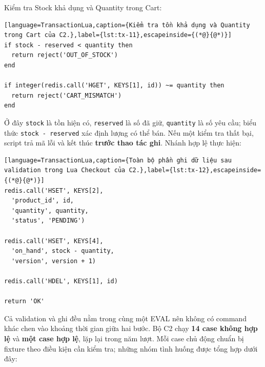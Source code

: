 Kiểm tra Stock khả dụng và Quantity trong Cart:

\begin{lstlisting}[language=TransactionLua,caption={Kiểm tra tồn khả dụng và Quantity trong Cart của C2.},label={lst:tx-11},escapeinside={(*@}{@*)}]
if stock - reserved < quantity then
  return reject('OUT_OF_STOCK')
end

if integer(redis.call('HGET', KEYS[1], id)) ~= quantity then
  return reject('CART_MISMATCH')
end
\end{lstlisting}

Ở đây \texttt{stock} là tồn hiện có, \texttt{reserved} là số đã giữ, \texttt{quantity} là số yêu cầu; biểu thức \texttt{stock -\allowbreak{} reserved} xác định lượng có thể bán. Nếu một kiểm tra thất bại, script trả mã lỗi và kết thúc \textbf{trước thao tác ghi}. Nhánh hợp lệ thực hiện:

\begin{lstlisting}[language=TransactionLua,caption={Toàn bộ phần ghi dữ liệu sau validation trong Lua Checkout của C2.},label={lst:tx-12},escapeinside={(*@}{@*)}]
redis.call('HSET', KEYS[2],
  'product_id', id,
  'quantity', quantity,
  'status', 'PENDING')

redis.call('HSET', KEYS[4],
  'on_hand', stock - quantity,
  'version', version + 1)

redis.call('HDEL', KEYS[1], id)

return 'OK'
\end{lstlisting}

Cả validation và ghi đều nằm trong cùng một EVAL nên không có command khác chen vào khoảng thời gian giữa hai bước. Bộ C2 chạy \textbf{14 case không hợp lệ} và \textbf{một case hợp lệ}, lặp lại trong năm lượt. Mỗi case chủ động chuẩn bị fixture theo điều kiện cần kiểm tra; những nhóm tình huống được tổng hợp dưới đây:

